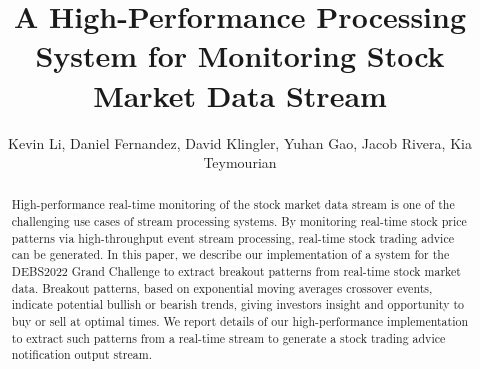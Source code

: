 \documentclass[sigconf]{acmart}
\begin{document}

\title{A High-Performance Processing System for Monitoring Stock Market Data Stream}


\author{Kevin Li, Daniel Fernandez, David Klingler, Yuhan Gao, Jacob Rivera, Kia Teymourian}



\begin{abstract}
  High-performance real-time monitoring of the stock market data stream is one of the challenging use cases of
  stream processing systems. By monitoring real-time stock price patterns via high-throughput event stream processing,
  real-time stock trading advice can be generated. In this paper, we describe our implementation of a system for the DEBS2022 Grand Challenge to extract
  breakout patterns from real-time stock market data. Breakout patterns, based on exponential moving averages
  crossover events, indicate potential bullish or bearish trends, giving investors insight and opportunity to buy or sell
  at optimal times. We report details of our high-performance implementation to extract such patterns from a real-time stream to generate a stock
  trading advice notification output stream.
\end{abstract}





\end{document}
